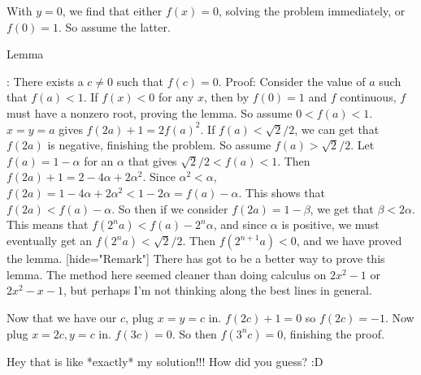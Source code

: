 \begin{mysolution}
With $ y = 0$, we find that either $ f(x) = 0$, solving the problem immediately, or $ f(0) = 1$. So assume the latter.

\begin{bolded}Lemma\end{bolded}: There exists a $ c\neq 0$ such that $ f(c) = 0$.
Proof: Consider the value of $ a$ such that $ f(a) < 1$. If $ f(x) < 0$ for any $ x$, then by $ f(0) = 1$ and $ f$ continuous, $ f$ must have a nonzero root, proving the lemma. So assume $ 0 < f(a) < 1$. $ x = y = a$ gives $ f(2a)+1 = 2f(a)^{2}$. If $ f(a) <\sqrt{2}/2$, we can get that $ f(2a)$ is negative, finishing the problem. So assume $ f(a) >\sqrt{2}/2$. Let $ f(a) = 1-\alpha$ for an $ \alpha$ that gives $ \sqrt{2}/2 < f(a) < 1$. Then $ f(2a)+1 = 2-4\alpha+2\alpha^{2}$. Since $ \alpha^{2}<\alpha$, $ f(2a) = 1-4\alpha+2\alpha^{2}< 1-2\alpha = f(a)-\alpha$. This shows that $ f(2a) < f(a)-\alpha$. So then if we consider $ f(2a) = 1-\beta$, we get that $ \beta < 2\alpha$. This means that $ f(2^{n}a) < f(a)-2^{n}\alpha$, and since $ \alpha$ is positive, we must eventually get an $ f(2^{n}a) <\sqrt{2}/2$. Then $ f(2^{n+1}a) < 0$, and we have proved the lemma.
[hide="Remark"]
There has got to be a better way to prove this lemma. The method here seemed cleaner than doing calculus on $ 2x^{2}-1$ or $ 2x^{2}-x-1$, but perhaps I'm not thinking along the best lines in general.


Now that we have our $ c$, plug $ x = y = c$ in. $ f(2c)+1 = 0$ so $ f(2c) =-1$. Now plug $ x = 2c, y = c$ in. $ f(3c) = 0$. So then $ f(3^{n}c) = 0$, finishing the proof.

\end{mysolution}



\begin{mysolution}
	Hey that is like *exactly* my solution!!! How did you guess? :D
\end{mysolution}



